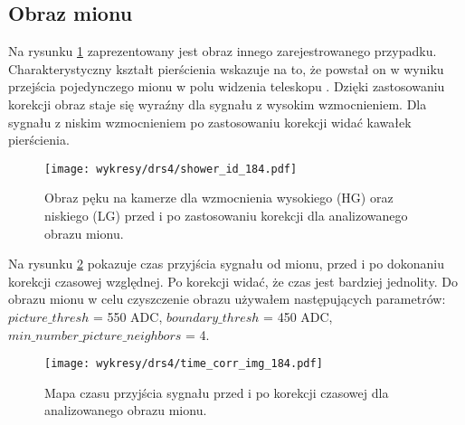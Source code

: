 \documentclass[a4paper,11pt,twoside]{article}
\begin{document}
\subsection{Obraz mionu}
Na rysunku \ref{fig:muon_image} zaprezentowany jest obraz innego zarejestrowanego przypadku. 
Charakterystyczny kształt pierścienia wskazuje na to, że powstał on w wyniku przejścia pojedynczego mionu w polu widzenia teleskopu \cite{muon_ring}. Dzięki zastosowaniu korekcji obraz staje się wyraźny dla sygnału z wysokim wzmocnieniem. Dla sygnału z niskim wzmocnieniem po zastosowaniu korekcji widać kawałek pierścienia. 
\begin{figure}[H] 
\centering
\texttt{[image: wykresy/drs4/shower\_id\_184.pdf]}
\caption{Obraz pęku na kamerze dla wzmocnienia wysokiego (HG) oraz niskiego (LG) przed i po zastosowaniu korekcji dla analizowanego obrazu mionu.}
\label{fig:muon_image}
\end{figure}
Na rysunku \ref{fig:time_corr_map_muon} pokazuje czas przyjścia sygnału od mionu, przed i po dokonaniu korekcji czasowej względnej. Po korekcji widać, że czas jest bardziej jednolity.
Do obrazu mionu w celu czyszczenie obrazu używałem następujących parametrów: $picture\_thresh$ = 550 ADC, $boundary\_thresh$ = 450 ADC, $min\_number\_picture\_neighbors$ = 4.
\begin{figure}[H] 
\centering
\texttt{[image: wykresy/drs4/time\_corr\_img\_184.pdf]}
\caption{Mapa czasu przyjścia sygnału przed i po korekcji czasowej dla analizowanego obrazu mionu.}
\label{fig:time_corr_map_muon}
\end{figure}
\newpage
\end{document}
